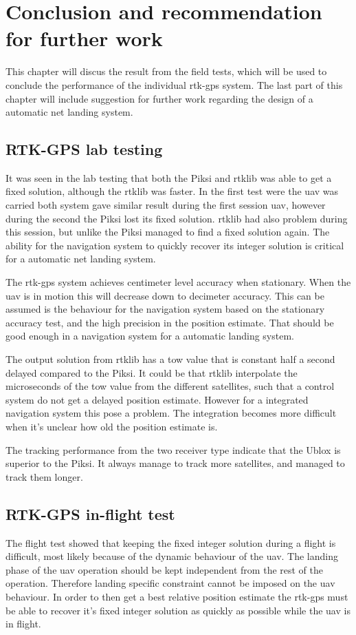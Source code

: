 
\chapter{Conclusion and recommendation for further work}
This chapter will discus the result from the field tests, which will be used to conclude the performance of the individual \gls{rtk-gps} system. The last part of this chapter will include suggestion for further work regarding the design of a automatic net landing system.
\section{RTK-GPS lab testing}
It was seen in the lab testing that both the Piksi and \gls{rtklib} was able to get a fixed solution, although the \gls{rtklib} was faster. In the first test were the \gls{uav} was carried both system gave similar result during the first session \gls{uav}, however during the second the Piksi lost its fixed solution. \gls{rtklib} had also problem during this session, but unlike the Piksi managed to find a fixed solution again. The ability for the navigation system to quickly recover its integer solution is critical for a automatic net landing system.

The \gls{rtk-gps} system achieves centimeter level accuracy when stationary. When the \gls{uav} is in motion this will decrease down to decimeter accuracy. This can be assumed is the behaviour for the navigation system based on the stationary accuracy test, and the high precision in the position estimate. That should be good enough in a navigation system for a automatic landing system.

The output solution from \gls{rtklib} has a \acrfull{tow} value that is constant half a second delayed compared to the Piksi. It could be that \gls{rtklib} interpolate the microseconds of the \gls{tow} value from the different satellites, such that a control system do not get a delayed position estimate. However for a integrated navigation system this pose a problem. The integration becomes more difficult when it's unclear how old the position estimate is.

The tracking performance from the two receiver type indicate that the Ublox is superior to the Piksi. It always manage to track more satellites, and managed to track them longer.
\section{RTK-GPS in-flight test}
The flight test showed that keeping the fixed integer solution during a flight is difficult, most likely because of the dynamic behaviour of the \gls{uav}. The landing phase of the \gls{uav} operation should be kept independent from the rest of the operation. Therefore landing specific constraint cannot be imposed on the \gls{uav} behaviour. In order to then get a best relative position estimate the \gls{rtk-gps} must be able to recover it's fixed integer solution as quickly as possible while the \gls{uav} is in flight.

